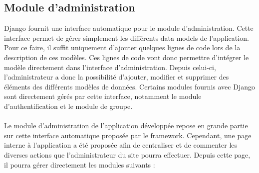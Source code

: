 \documentclass[12pt, a4paper, oneside]{article}
\begin{document}
\subsection{Module d'administration}
    \indent Django fournit une interface automatique pour le module d'administration. Cette interface permet de gérer simplement les différents data models de l'application. Pour ce faire, il suffit uniquement d'ajouter quelques lignes de code lors de la description de ces modèles. Ces lignes de code vont donc permettre d'intégrer le modèle directement dans l'interface d'administration. Depuis celui-ci, l'administrateur a donc la possibilité d'ajouter, modifier et supprimer des éléments des différents modèles de données. Certains modules fournis avec Django sont directement gérés par cette interface, notamment le module d'authentification et le module de groupe.\\\\
    \indent Le module d'administration de l'application développée repose en grande partie sur cette interface automatique proposée par le framework. Cependant, une page interne à l'application a été proposée afin de centraliser et de commenter les diverses actions que l'administrateur du site pourra effectuer. Depuis cette page, il pourra gérer directement les modules suivants :\\
\end{document}
